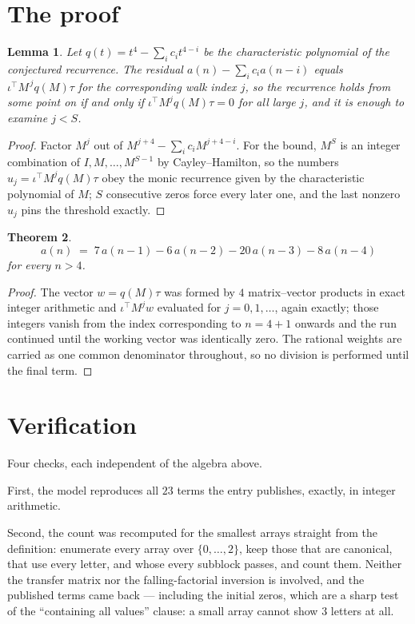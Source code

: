 \documentclass[11pt,a4paper]{article}
\theoremstyle{plain}
\newtheorem{theorem}{Theorem}
\newtheorem{lemma}[theorem]{Lemma}
\theoremstyle{definition}
\begin{document}
\section{The proof}

\begin{lemma}\label{lem:crit}
Let $q(t)=t^{4}-\sum_i c_it^{4-i}$ be the characteristic polynomial of the
conjectured recurrence. The residual $a(n)-\sum_ic_ia(n-i)$ equals
$\iota^{\!\top}M^{\,j}q(M)\tau$ for the corresponding walk index $j$, so the recurrence
holds from some point on if and only if $\iota^{\!\top}M^{j}q(M)\tau=0$ for all large $j$,
and it is enough to examine $j<S$.
\end{lemma}

\begin{proof}
Factor $M^{j}$ out of $M^{j+4}-\sum_ic_iM^{j+4-i}$. For the bound, $M^{S}$
is an integer combination of $I,M,\dots,M^{S-1}$ by Cayley--Hamilton, so the numbers
$u_j=\iota^{\!\top}M^{j}q(M)\tau$ obey the monic recurrence given by the characteristic
polynomial of $M$; $S$ consecutive zeros force every later one, and the last nonzero $u_j$
pins the threshold exactly.
\end{proof}

\begin{theorem}
\[
a(n)\;=\;7\,a(n-1) - 6\,a(n-2) - 20\,a(n-3) - 8\,a(n-4)
\]
for every $n>4$.
\end{theorem}

\begin{proof}
The vector $w=q(M)\tau$ was formed by $4$ matrix--vector products in exact integer
arithmetic and $\iota^{\!\top}M^{j}w$ evaluated for $j=0,1,\dots$, again exactly; those
integers vanish from the index corresponding to $n=4+1$ onwards and the run continued
until the working vector was identically zero. The rational weights are carried as one common
denominator throughout, so no division is performed until the final term.
\end{proof}

\section{Verification}

Four checks, each independent of the algebra above.

First, the model reproduces all $23$ terms the entry publishes, exactly, in integer
arithmetic.

Second, the count was recomputed for the smallest arrays straight from the definition:
enumerate every array over $\{0,\dots,2\}$, keep those that are canonical, that use every
letter, and whose every subblock passes, and count them. Neither the transfer matrix nor the
falling-factorial inversion is involved, and the published terms came back --- including the
initial zeros, which are a sharp test of the ``containing all values'' clause: a small array
cannot show $3$ letters at all.
\end{document}
